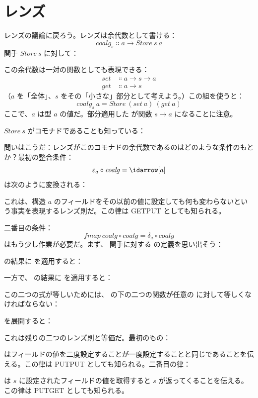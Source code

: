 \section{レンズ}

レンズの議論に戻ろう。レンズは余代数として書ける：
\[\mathit{coalg}_s \Colon a \to \mathit{Store}\ s\ a\]
関手 $\mathit{Store}\ s$ に対して：

この余代数は一対の関数としても表現できる：
\begin{align*}
  \mathit{set} & \Colon a \to s \to a \\
  \mathit{get} & \Colon a \to s
\end{align*}
（$a$ を「全体」、$s$ をその「小さな」部分として考えよう。）この組を使うと：
\[\mathit{coalg}_s\ a = \mathit{Store}\ (\mathit{set}\ a)\ (\mathit{get}\ a)\]
ここで、$a$ は型 $a$ の値だ。部分適用した  が関数 $s \to a$ になることに注意。

$\mathit{Store}\ s$ がコモナドであることも知っている：

問いはこうだ：レンズがこのコモナドの余代数であるのはどのような条件のもとか？最初の整合条件：
\[\varepsilon_a \circ \mathit{coalg} = \idarrow[a]\]
は次のように変換される：

これは、構造 $a$ のフィールドをその以前の値に設定しても何も変わらないという事実を表現するレンズ則だ。この律は GETPUT としても知られる。

二番目の条件：
\[\mathit{fmap}\ \mathit{coalg} \circ \mathit{coalg} = \delta_a \circ \mathit{coalg}\]
はもう少し作業が必要だ。まず、 関手に対する  の定義を思い出そう：

 の結果に  を適用すると：

一方で、 の結果に  を適用すると：

この二つの式が等しいためには、 の下の二つの関数が任意の  に対して等しくなければならない：

 を展開すると：

これは残りの二つのレンズ則と等価だ。最初のもの：

はフィールドの値を二度設定することが一度設定することと同じであることを伝える。この律は PUTPUT としても知られる。二番目の律：

は $s$ に設定されたフィールドの値を取得すると $s$ が返ってくることを伝える。この律は PUTGET としても知られる。


